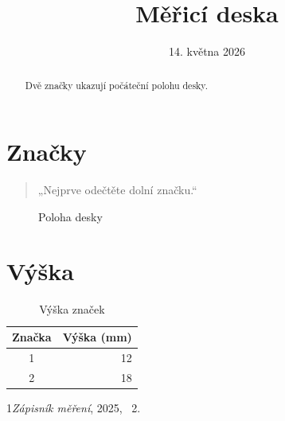 \documentclass{article}
\begin{document}
\title{Měřicí deska}\author{}\date{14. května 2026}\maketitle
\begin{abstract}Dvě značky ukazují počáteční polohu desky.\end{abstract}
\tableofcontents
\section{Značky}\begin{quote}„Nejprve odečtěte dolní značku.“\end{quote}
\begin{figure}[ht]\centering\fbox{\rule{0pt}{8mm}\rule{33mm}{0pt}}\caption{Poloha desky}\end{figure}
\section{Výška}
\begin{table}[ht]\centering\begin{tabular}{cr}Značka&Výška (mm)\\\hline 1&12\\2&18\end{tabular}\caption{Výška značek}\end{table}
\begin{thebibliography}{1}\emph{Zápisník měření}, 2025, \chaptername~2.\end{thebibliography}
\end{document}
